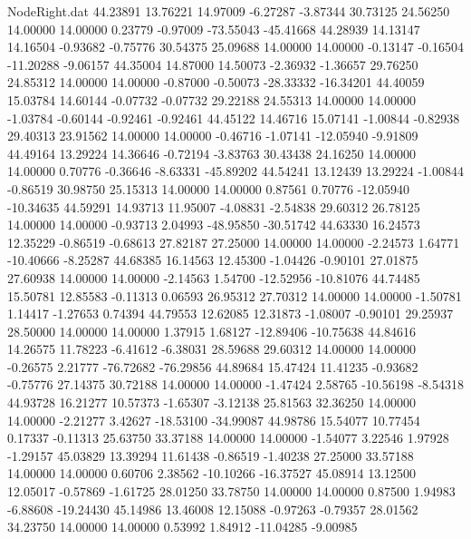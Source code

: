 \begin{filecontents}{NodeRight.dat}
  44.23891   13.76221   14.97009    -6.27287   -3.87344   30.73125   24.56250   14.00000   14.00000    0.23779   -0.97009  -73.55043  -45.41668
  44.28939   14.13147   14.16504    -0.93682   -0.75776   30.54375   25.09688   14.00000   14.00000   -0.13147   -0.16504  -11.20288   -9.06157
  44.35004   14.87000   14.50073    -2.36932   -1.36657   29.76250   24.85312   14.00000   14.00000   -0.87000   -0.50073  -28.33332  -16.34201
  44.40059   15.03784   14.60144    -0.07732   -0.07732   29.22188   24.55313   14.00000   14.00000   -1.03784   -0.60144   -0.92461   -0.92461
  44.45122   14.46716   15.07141    -1.00844   -0.82938   29.40313   23.91562   14.00000   14.00000   -0.46716   -1.07141  -12.05940   -9.91809
  44.49164   13.29224   14.36646    -0.72194   -3.83763   30.43438   24.16250   14.00000   14.00000    0.70776   -0.36646   -8.63331  -45.89202
  44.54241   13.12439   13.29224    -1.00844   -0.86519   30.98750   25.15313   14.00000   14.00000    0.87561    0.70776  -12.05940  -10.34635
  44.59291   14.93713   11.95007    -4.08831   -2.54838   29.60312   26.78125   14.00000   14.00000   -0.93713    2.04993  -48.95850  -30.51742
  44.63330   16.24573   12.35229    -0.86519   -0.68613   27.82187   27.25000   14.00000   14.00000   -2.24573    1.64771  -10.40666   -8.25287
  44.68385   16.14563   12.45300    -1.04426   -0.90101   27.01875   27.60938   14.00000   14.00000   -2.14563    1.54700  -12.52956  -10.81076
  44.74485   15.50781   12.85583    -0.11313    0.06593   26.95312   27.70312   14.00000   14.00000   -1.50781    1.14417   -1.27653    0.74394
  44.79553   12.62085   12.31873    -1.08007   -0.90101   29.25937   28.50000   14.00000   14.00000    1.37915    1.68127  -12.89406  -10.75638
  44.84616   14.26575   11.78223    -6.41612   -6.38031   28.59688   29.60312   14.00000   14.00000   -0.26575    2.21777  -76.72682  -76.29856
  44.89684   15.47424   11.41235    -0.93682   -0.75776   27.14375   30.72188   14.00000   14.00000   -1.47424    2.58765  -10.56198   -8.54318
  44.93728   16.21277   10.57373    -1.65307   -3.12138   25.81563   32.36250   14.00000   14.00000   -2.21277    3.42627  -18.53100  -34.99087
  44.98786   15.54077   10.77454     0.17337   -0.11313   25.63750   33.37188   14.00000   14.00000   -1.54077    3.22546    1.97928   -1.29157
  45.03829   13.39294   11.61438    -0.86519   -1.40238   27.25000   33.57188   14.00000   14.00000    0.60706    2.38562  -10.10266  -16.37527
  45.08914   13.12500   12.05017    -0.57869   -1.61725   28.01250   33.78750   14.00000   14.00000    0.87500    1.94983   -6.88608  -19.24430
  45.14986   13.46008   12.15088    -0.97263   -0.79357   28.01562   34.23750   14.00000   14.00000    0.53992    1.84912  -11.04285   -9.00985

\end{filecontents}

